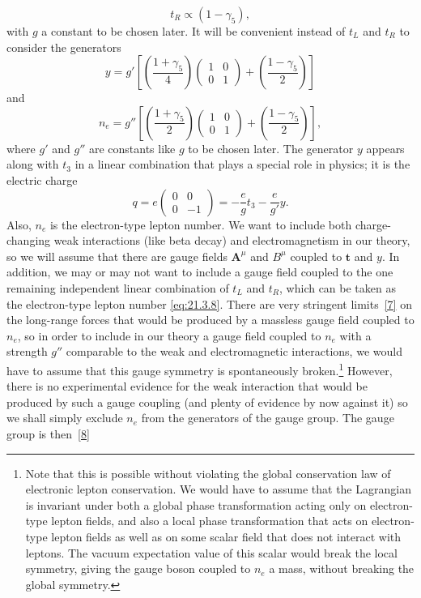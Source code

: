 \begin{equation}
t_R\propto(1-\gamma_5),
\tag{21.3.6}\label{eq:21.3.6}
\end{equation}
with $g$ a constant to be chosen later. It will be convenient instead of $t_L$ and $t_R$ to consider the generators
\begin{equation}
y=g'\left[
\left(\frac{1+\gamma_5}{4}\right)
\begin{pmatrix}1&0\\0&1\end{pmatrix}
+\left(\frac{1-\gamma_5}{2}\right)
\right]
\tag{21.3.7}\label{eq:21.3.7}
\end{equation}
and
\begin{equation}
n_e=g''\left[
\left(\frac{1+\gamma_5}{2}\right)
\begin{pmatrix}1&0\\0&1\end{pmatrix}
+\left(\frac{1-\gamma_5}{2}\right)
\right],
\tag{21.3.8}\label{eq:21.3.8}
\end{equation}
where $g'$ and $g''$ are constants like $g$ to be chosen later. The generator $y$ appears along with $t_3$ in a linear combination that plays a special role in physics; it is the electric charge
\begin{equation}
q=e\begin{pmatrix}0&0\\0&-1\end{pmatrix}
=-\frac{e}{g}t_3-\frac{e}{g'}y.
\tag{21.3.9}\label{eq:21.3.9}
\end{equation}
Also, $n_e$ is the electron-type lepton number. We want to include both charge-changing weak interactions (like beta decay) and electromagnetism in our theory, so we will assume that there are gauge fields $\mathbf{A}^\mu$ and $B^\mu$ coupled to $\mathbf{t}$ and $y$. In addition, we may or may not want to include a gauge field coupled to the one remaining independent linear combination of $t_L$ and $t_R$, which can be taken as the electron-type lepton number \eqref{eq:21.3.8}. There are very stringent limits~\hyperref[ch21-ref-7]{[7]} on the long-range forces that would be produced by a massless gauge field coupled to $n_e$, so in order to include in our theory a gauge field coupled to $n_e$ with a strength $g''$ comparable to the weak and electromagnetic interactions, we would have to assume that this gauge symmetry is spontaneously broken.\footnote{Note that this is possible without violating the global conservation law of electronic lepton conservation. We would have to assume that the Lagrangian is invariant under both a global phase transformation acting only on electron-type lepton fields, and also a local phase transformation that acts on electron-type lepton fields as well as on some scalar field that does not interact with leptons. The vacuum expectation value of this scalar would break the local symmetry, giving the gauge boson coupled to $n_e$ a mass, without breaking the global symmetry.} However, there is no experimental evidence for the weak interaction that would be produced by such a gauge coupling (and plenty of evidence by now against it) so we shall simply exclude $n_e$ from the generators of the gauge group. The gauge group is then~\hyperref[ch21-ref-8]{[8]}
